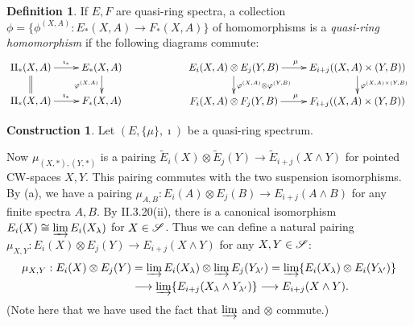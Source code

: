 \documentclass[11pt]{article}
\theoremstyle{plain}
\theoremstyle{definition}
\newtheorem{const}[thm]{Construction}
\newtheorem{defn}[thm]{Definition}
\begin{document}
\begin{defn}
If $E,F$ are quasi-ring spectra, a collection
$\phi=\{\phi^{(X,A)}:E_*(X,A)\to F_*(X,A)\}$ of homomorphisms is a
\emph{quasi-ring homomorphism} if the following diagrams commute:
\[\xymatrix@R=.6cm{
\Pi_*(X,A)\ar[r]^{\imath_*}\ar@{=}[d]&E_*(X,A)\ar[d]_{\phi^{(X,A)}}\\
\Pi_*(X,A)\ar[r]^{\imath_*}&F_*(X,A)
}\textup{\qquad \qquad\qquad}
\xymatrix@R=.6cm{
E_i(X,A)\otimes E_j(Y,B)\ar[r]^{\mu}\ar[d]^{\phi^{(X,A)}\otimes\phi^{(Y,B)}}&
E_{i+j}((X,A)\times (Y,B))\ar[d]^{\phi^{(X,A)\times(Y,B)}}\\
F_i(X,A)\otimes F_j(Y,B)\ar[r]^{\mu}&F_{i+j}((X,A)\times (Y,B))
}\]
\end{defn}
\begin{const}
Let $(E,\{\mu\},\imath)$ be a quasi-ring spectrum.
\begin{itemise}
\itm[(a)] Now $\mu_{(X,*),(Y,*)}$ is a pairing $\widetilde E_i(X)\otimes
\widetilde E_j(Y)\to\widetilde E_{i+j}(X\wedge Y)$ for pointed CW-spaces $X,Y$.
This pairing commutes with the two suspension isomorphisms.
\itm[(b)]By (a), we have a pairing $\mu_{A,B}:E_i(A)\otimes E_j(B)\to
E_{i+j}(A\wedge B)$ for any finite spectra $A,B$. By II.3.20(ii), there is a
canonical isomorphism $E_i(X)\cong\varinjlim E_i(X_\lambda)$ for $X\in\scrS$.
Thus we can define a natural pairing $\mu_{X,Y}:E_i(X)\otimes E_j(Y)\to
E_{i+j}(X\wedge Y)$ for any $X,Y\in\scrS$:
\begin{alignat*}{2}
\mu_{X,Y}:E_i(X)\otimes E_j(Y)&=\varinjlim E_i(X_\lambda)\otimes\varinjlim
E_j(Y_{\lambda'})=\varinjlim\{E_i(X_\lambda)\otimes E_i(Y_{\lambda'})\}\\
&\to\varinjlim \{E_{i+j}(X_\lambda\wedge Y_{\lambda'})\}
\to E_{i+j}(X\wedge Y).
\end{alignat*}
(Note here that we have used the fact that $\varinjlim$ and $\otimes$ commute.)
\end{itemise}
\end{const}
\end{document}
